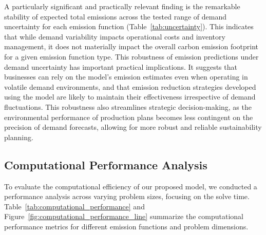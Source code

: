 \begin{table}[htbp]
A particularly significant and practically relevant finding is the remarkable stability of expected total emissions across the tested range of demand uncertainty for each emission function (Table~\ref{tab:uncertainty}).  This indicates that while demand variability impacts operational costs and inventory management, it does not materially impact the overall carbon emission footprint for a given emission function type.  This robustness of emission predictions under demand uncertainty has important practical implications. It suggests that businesses can rely on the model's emission estimates even when operating in volatile demand environments, and that emission reduction strategies developed using the model are likely to maintain their effectiveness irrespective of demand fluctuations.  This robustness also streamlines strategic decision-making, as the environmental performance of production plans becomes less contingent on the precision of demand forecasts, allowing for more robust and reliable sustainability planning.

\subsection{Computational Performance Analysis}
\label{subsec:computational_performance}
To evaluate the computational efficiency of our proposed model, we conducted a performance analysis across varying problem sizes, focusing on the solve time. Table~\ref{tab:computational_performance} and Figure~\ref{fig:computational_performance_line} summarize the computational performance metrics for different emission functions and problem dimensions.


\end{table}

